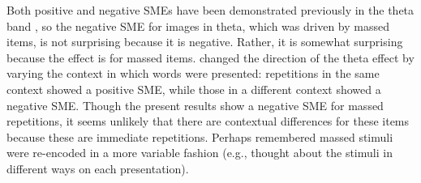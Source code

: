 Both positive and negative SMEs have been demonstrated previously in the theta band \cite{HansStau2014}, so the negative SME for images in theta, which was driven by massed items, is not surprising because it is negative.  Rather, it is somewhat surprising because the effect is for massed items.   changed the direction of the theta effect by varying the context in which words were presented: repetitions in the same context showed a positive SME, while those in a different context showed a negative SME.  Though the present results show a negative SME for massed repetitions, it seems unlikely that there are contextual differences for these items because these are immediate repetitions.  Perhaps remembered massed stimuli were re-encoded in a more variable fashion (e.g., thought about the stimuli in different ways on each presentation).




